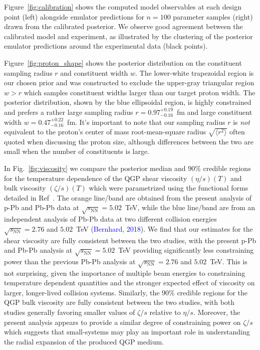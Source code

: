 \documentclass[3p,times,procedia,sort&compress]{elsarticle}
\newcommand{\sqrts}{\sqrt{s_\mathrm{NN}}}
\newcommand{\citetemp}[1]{(\textcolor{blue}{#1})}
\begin{document}
Figure~\ref{fig:calibration} shows the computed model observables at each design point (left) alongside emulator predictions for $n=100$ parameter samples (right) drawn from the calibrated posterior.
We observe good agreement between the calibrated model and experiment, as illustrated by the clustering of the posterior emulator predictions around the experimental data (black points).

Figure~\ref{fig:proton_shape} shows the posterior distribution on the constituent sampling radius $r$ and constituent width $w$.
The lower-white trapezoidal region is our chosen prior and was constructed to exclude the upper-gray triangular region $w > r$ which samples constituent widths larger than our target proton width.
The posterior distribution, shown by the blue ellipsoidal region, is highly constrained and prefers a rather large sampling radius $r=0.97_{-0.16}^{+0.19}$~fm and large constituent width $w=0.47_{-0.16}^{+0.22}$~fm.
It's important to note that our sampling radius $r$ is \emph{not} equivalent to the proton's center of mass root-mean-square radius $\sqrt{\langle r^2 \rangle}$ often quoted when discussing the proton size, although differences between the two are small when the number of constituents is large.

In Fig.~\ref{fig:viscosity} we compare the posterior median and 90\% credible regions for the temperature dependence of the QGP shear viscosity $(\eta/s)(T)$ and bulk viscosity $(\zeta/s)(T)$ which were parametrized using the functional forms detailed in Ref~\cite{Bass:2017zyn}.
The orange line/band are obtained from the present analysis of p-Pb and Pb-Pb data at $\sqrts=5.02$~TeV, while the blue line/band are from an independent analysis of Pb-Pb data at two different collision energies $\sqrts=2.76$ and $5.02$~TeV \citetemp{Bernhard, 2018}.
We find that our estimates for the shear viscosity are fully consistent between the two studies, with the present p-Pb and Pb-Pb analysis at $\sqrts=5.02$~TeV providing significantly less constraining power than the previous Pb-Pb analysis at $\sqrts=2.76$ and $5.02$~TeV.
This is not surprising, given the importance of multiple beam energies to constraining temperature dependent quantities and the stronger expected effect of viscosity on larger, longer-lived collision systems.
Similarly, the 90\% credible regions for the QGP bulk viscosity are fully consistent between the two studies, with both studies generally favoring smaller values of $\zeta/s$ relative to $\eta/s$.
Moreover, the present analysis appears to provide a similar degree of constraining power on $\zeta/s$ which suggests that small-systems may play an important role in understanding the radial expansion of the produced QGP medium.



\end{document}
